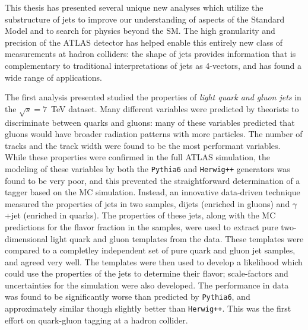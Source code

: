 \label{chapter:conclusion}

This thesis has presented several unique new analyses which utilize the substructure of jets to improve our understanding of aspects of the Standard Model and to search for physics beyond the SM. The high granularity and precision of the ATLAS detector has helped enable this entirely new class of measurements at hadron colliders: the shape of jets provides information that is complementary to traditional interpretations of jets as 4-vectors, and has found a wide range of applications.

The first analysis presented studied the properties of \textit{light quark and gluon jets} in the $\sqrt{s} = 7$~TeV dataset. Many different variables were predicted by theorists to discriminate between quarks and gluons: many of these variables predicted that gluons would have broader radiation patterns with more particles. The number of tracks and the track width were found to be the most performant variables. While these properties were confirmed in the full ATLAS simulation, the modeling of these variables by both the \texttt{Pythia6} and \texttt{Herwig++} generators was found to be very poor, and this prevented the straightforward determination of a tagger based on the MC simulation. Instead, an innovative data-driven technique measured the properties of jets in two samples, dijets (enriched in gluons) and $\gamma$+jet (enriched in quarks). The properties of these jets, along with the MC predictions for the flavor fraction in the samples, were used to extract pure two-dimensional light quark and gluon templates from the data. These templates were compared to a completley independent set of pure quark and gluon jet samples, and agreed very well. The templates were then used to develop a likelihood which could use the properties of the jets to determine their flavor; scale-factors and uncertainties for the simulation were also developed. The performance in data was found to be significantly worse than predicted by \texttt{Pythia6}, and approximately similar though slightly better than \texttt{Herwig++}.  This was the first effort on quark-gluon tagging at a hadron collider.

